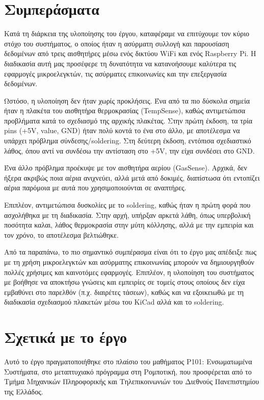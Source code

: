 \documentclass[conference]{IEEEtran}
\begin{document}
\section{Συμπεράσματα}

Κατά τη διάρκεια της υλοποίησης του έργου, καταφέραμε να επιτύχουμε τον κύριο στόχο του συστήματος, ο οποίος ήταν η ασύρματη συλλογή και παρουσίαση δεδομένων από τρεις αισθητήρες μέσω ενός δικτύου WiFi και ενός Raspberry Pi. Η διαδικασία αυτή μας προσέφερε τη δυνατότητα να κατανοήσουμε καλύτερα τις εφαρμογές μικροελεγκτών, τις ασύρματες επικοινωνίες και την επεξεργασία δεδομένων.

Ωστόσο, η υλοποίηση δεν ήταν χωρίς προκλήσεις. Ένα από τα πιο δύσκολα σημεία ήταν η πλακέτα του αισθητήρα θερμοκρασίας (TempSense), καθώς αντιμετώπισα προβλήματα κατά το σχεδιασμό της αρχικής πλακέτας. Στην πρώτη έκδοση, τα τρία pins (+5V, value, GND) ήταν πολύ κοντά το ένα στο άλλο, με αποτέλεσμα να υπάρχει πρόβλημα σύνδεσης/soldering. Στη δεύτερη έκδοση, εντόπισα σχεδιαστικό λάθος, όπου αντί να συνδέσω την αντίσταση στο +5V, την είχα συνδέσει στο GND.

Ένα άλλο πρόβλημα προέκυψε με τον αισθητήρα αερίου (GasSense). Αρχικά, δεν ήξερα ακριβώς ποια αέρια ανιχνεύει, αλλά μετά από δοκιμές, διαπίστωσα ότι εντοπίζει αέρια παρόμοια με αυτά που χρησιμοποιούνται σε αναπτήρες.

Επιπλέον, αντιμετώπισα δυσκολίες με το soldering, καθώς ήταν η πρώτη φορά που ασχολήθηκα με τη διαδικασία. Στην αρχή, υπήρξαν αρκετά λάθη, όπως υπερβολική ποσότητα καλαι, λάθος θερμοκρασία στην μύτη κόλλησης, αλλά με την εμπειρία και τον χρόνο, το αποτέλεσμα βελτιώθηκε.

Από τα παραπάνω, το πιο σημαντικό συμπέρασμα είναι ότι το έργο μας απέδειξε πως με τη χρήση μικροελεγκτών και ασύρματης επικοινωνίας μπορούν να δημιουργηθούν πολλές χρήσιμες και καινοτόμες εφαρμογές. Επιπλέον, η υλοποίηση του συστήματος με βοήθησε να αποκτήσω γνώσεις και εμπειρίες σε τομείς στους οποίους δεν είχα εμβαθύνει στο παρελθόν (π.χ. διαιρέτες τάσεων), καθώς και να εξοικειωθώ με τη διαδικασία σχεδιασμού πλακετών μέσω του KiCad αλλά και το soldering.

\section{Σχετικά με το έργο}
Αυτό το έργο πραγματοποιήθηκε στο πλαίσιο του μαθήματος Ρ101: Ενσωματωμένα Συστήματα, στο μεταπτυχιακό πρόγραμμα στη Ρομποτική, που προσφέρεται από το Τμήμα Μηχανικών Πληροφορικής και Τηλεπικοινωνιών του Διεθνούς Πανεπιστημίου της Ελλάδος.
\end{document}
